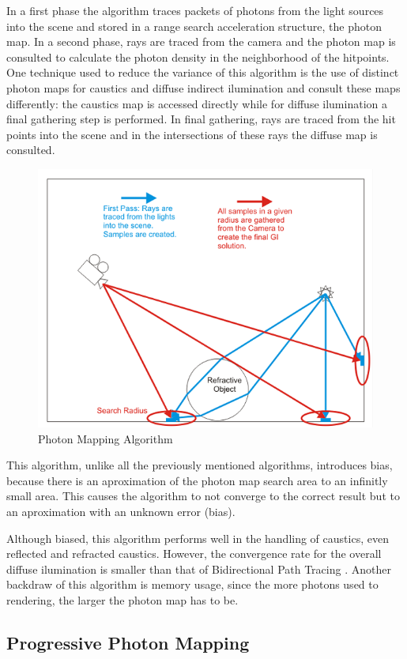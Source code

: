 In a first phase the algorithm traces packets of photons from the light sources into the scene and stored in a range search acceleration structure, the photon map. In a second phase, rays are traced from the camera and the photon map is consulted to calculate the photon density in the neighborhood of the hitpoints. One technique used to reduce the variance of this algorithm is the use of distinct photon maps for caustics and diffuse indirect ilumination and consult these maps differently: the caustics map is accessed directly while for diffuse ilumination a final gathering step is performed. In final gathering, rays are traced from the hit points into the scene and in the intersections of these rays the diffuse map is consulted.

\begin{figure}[H]
\centering
\includegraphics[width=0.75\linewidth]{img/pmDiagram.png}
\caption{\label{img:pmdiag} Photon Mapping Algorithm}
\end{figure}

This algorithm, unlike all the previously mentioned algorithms, introduces bias, because there is an aproximation of the photon map search area to an infinitly small area. This causes the algorithm to not converge to the correct result but to an aproximation with an unknown error (bias).

Although biased, this algorithm performs well in the handling of caustics, even reflected and refracted caustics. However, the convergence rate for the overall diffuse ilumination is smaller than that of Bidirectional Path Tracing \citep{Georgiev}. Another backdraw of this algorithm is memory usage, since the more photons used to rendering, the larger the photon map has to be.

\subsection{Progressive Photon Mapping}

